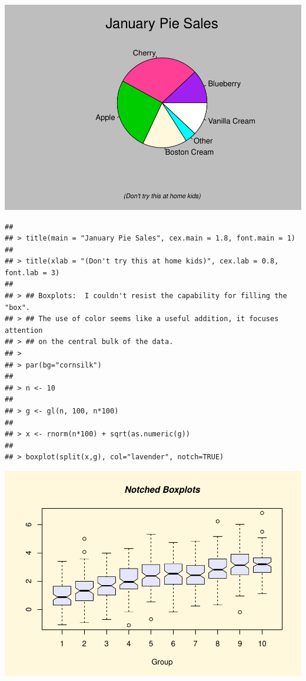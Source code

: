 \documentclass[
]{book}
\begin{document}
\includegraphics{TudodoR_files/figure-latex/unnamed-chunk-147-3.pdf}

\begin{verbatim}
## 
## > title(main = "January Pie Sales", cex.main = 1.8, font.main = 1)
## 
## > title(xlab = "(Don't try this at home kids)", cex.lab = 0.8, font.lab = 3)
## 
## > ## Boxplots:  I couldn't resist the capability for filling the "box".
## > ## The use of color seems like a useful addition, it focuses attention
## > ## on the central bulk of the data.
## > 
## > par(bg="cornsilk")
## 
## > n <- 10
## 
## > g <- gl(n, 100, n*100)
## 
## > x <- rnorm(n*100) + sqrt(as.numeric(g))
## 
## > boxplot(split(x,g), col="lavender", notch=TRUE)
\end{verbatim}

\includegraphics{TudodoR_files/figure-latex/unnamed-chunk-147-4.pdf}
\end{document}
